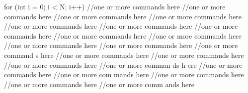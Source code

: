 \begin{sloppypar}
\begin{lstcodeminimal}[]
for (int i = 0; i < N; i++) {
    //one or more commands here
    //one or more commands here
    //one or more commands here
    //one or more commands here
    //one or more commands here
    //one or more commands here
    //one or more commands here
    //one or more commands here
    //one or more commands here
    //one or more commands here
    //one or more commands here
    //one or more command s here
    //one or more commands here
    //one or more commands here
    //one or more commands here
    //one or more comman ds h ere
    //one or more commands here
    //one or more com mands here
    //one or more commands here
    //one or more commands here
    //one or more comm ands  here
}
\end{lstcodeminimal}

\end{sloppypar}
